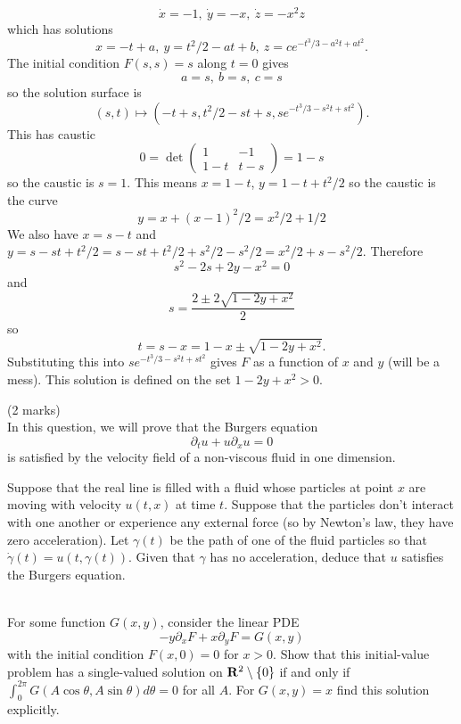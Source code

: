 \documentclass[12pt]{article}
\begin{document}
\begin{answer}
\begin{enumerate}[(a)]
\[\dot{x}=-1,\ \dot{y}=-x,\ \dot{z}=-x^2z\]
which has solutions
\[x=-t+a,\ y=t^2/2-at+b,\ z=ce^{-t^3/3-a^2t+at^2}.\]
The initial condition $F(s,s)=s$ along $t=0$ gives
\[a=s,\ b=s,\ c=s\]
so the solution surface is
\[(s,t)\mapsto (-t+s,t^2/2-st+s,se^{-t^3/3-s^2t+st^2}).\]
This has caustic
\[0=\det\left(\begin{array}{cc}
1 & -1\\
1-t & t-s
\end{array}\right)=1-s\]
so the caustic is $s=1$. This means $x=1-t$, $y=1-t+t^2/2$ so the caustic is the curve
\[y=x+(x-1)^2/2=x^2/2+1/2\]
We also have $x=s-t$ and $y=s-st+t^2/2=s-st+t^2/2+s^2/2-s^2/2=x^2/2+s-s^2/2$. Therefore
\[s^2-2s+2y-x^2=0\]
and
\[s=\frac{2\pm 2\sqrt{1-2y+x^2}}{2}\]
so
\[t=s-x=1-x\pm \sqrt{1-2y+x^2}.\]
Substituting this into $se^{-t^3/3-s^2t+st^2}$ gives $F$ as a function of $x$ and $y$ (will be a mess). This solution is defined on the set $1-2y+x^2>0$.
\end{enumerate}
\end{answer}
\fi

\newpage

\begin{question}(2 marks)\\
In this question, we will prove that the Burgers equation
\[\partial_tu+u\partial_xu=0\]
is satisfied by the velocity field of a non-viscous fluid in one dimension.

Suppose that the real line is filled with a fluid whose particles at point $x$ are moving with velocity $u(t,x)$ at time $t$. Suppose that the particles don't interact with one another or experience any external force (so by Newton's law, they have zero acceleration). Let $\gamma(t)$ be the path of one of the fluid particles so that $\dot{\gamma}(t)=u(t,\gamma(t))$. Given that $\gamma$ has no acceleration, deduce that $u$ satisfies the Burgers equation.
\end{question}

\iffalse
\begin{answer}
If we differentiate $\dot{\gamma}(t)=u(t,\gamma(t))$ using the chain rule then we get
\[\ddot{\gamma}(t)=\pd{u}{t}+\dot{\gamma}\pd{u}{x}\]
so $\ddot{\gamma}=0$ gives the Burgers equation.
\mks{2}
\end{answer}
\newpage
\fi

\bigskip

\begin{question}\ \\
For some function $G(x,y)$, consider the linear PDE
\[-y\partial_xF+x\partial_yF=G(x,y)\]
with the initial condition $F(x,0)=0$ for $x>0$. Show that this initial-value problem has a single-valued solution on $\mathbf{R}^2\setminus\{0\}$ if and only if $\int_0^{2\pi}G(A\cos\theta,A\sin\theta)d\theta=0$ for all $A$. For $G(x,y)=x$ find this solution explicitly.
\end{question}
\end{document}
